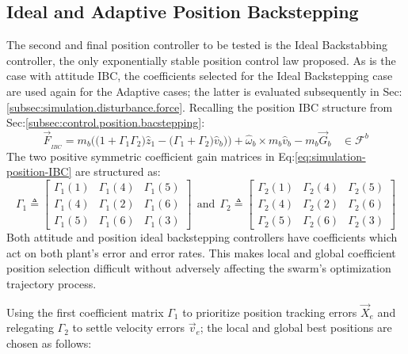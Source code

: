 \subsection{Ideal and Adaptive Position Backstepping}
\label{subsec:simulation.position.pd}
The second and final position controller to be tested is the Ideal Backstabbing controller, the only exponentially stable position control law proposed. As is the case with attitude IBC, the coefficients selected for the Ideal Backstepping case are used again for the Adaptive cases; the latter is evaluated subsequently in Sec:\ref{subsec:simulation.disturbance.force}. Recalling the position IBC structure from Sec:\ref{subsec:control.position.bacstepping}:
\begin{equation}\label{eq:simulation-position-IBC}
\vec{F}_{_{IBC}}=m_b\Big(\big(1+\Gamma_1\Gamma_2\big)\hat{z}_1-\big(\Gamma_1+\Gamma_2\big)\hat{v}_b\big)\Big)+\hat{\omega}_b\times m_b\hat{v}_b-m_b\vec{G}_b~~~~\in\mathcal{F}^{b}
\end{equation}
The two positive symmetric coefficient gain matrices in Eq:\ref{eq:simulation-position-IBC} are structured as:
\begin{equation}\label{eq:simulation-position-diagonal-coefficients}
\Gamma_1\triangleq \begin{bmatrix}
\Gamma_1(1) & \Gamma_1(4) & \Gamma_1(5)\\
\Gamma_1(4) & \Gamma_1(2) & \Gamma_1(6)\\
\Gamma_1(5) & \Gamma_1(6) & \Gamma_1(3)
\end{bmatrix}
~~\text{and}~~\Gamma_2\triangleq \begin{bmatrix}
\Gamma_2(1) & \Gamma_2(4) & \Gamma_2(5)\\
\Gamma_2(4) & \Gamma_2(2) & \Gamma_2(6)\\
\Gamma_2(5) & \Gamma_2(6) & \Gamma_2(3)
\end{bmatrix}
\end{equation}
Both attitude and position ideal backstepping controllers have coefficients which act on both plant's error and error rates. This makes local and global coefficient position selection difficult without adversely affecting the swarm's optimization trajectory process. 
\par
Using the first coefficient matrix $\Gamma_1$ to prioritize position tracking errors $\vec{X}_e$ and relegating $\Gamma_2$ to settle velocity errors $\vec{v}_e$; the local and global best positions are chosen as follows:
